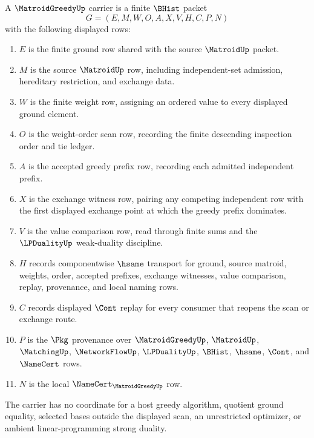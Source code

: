 \begin{definition}
\label{def:matroid-greedy-carrier}
A $\MatroidGreedyUp$ carrier is a finite $\BHist$ packet
$$
G=(E,M,W,O,A,X,V,H,C,P,N)
$$
with the following displayed rows:
\begin{enumerate}
\item $E$ is the finite ground row shared with the source $\MatroidUp$ packet.
\item $M$ is the source $\MatroidUp$ row, including independent-set admission, hereditary restriction, and exchange data.
\item $W$ is the finite weight row, assigning an ordered value to every displayed ground element.
\item $O$ is the weight-order scan row, recording the finite descending inspection order and tie ledger.
\item $A$ is the accepted greedy prefix row, recording each admitted independent prefix.
\item $X$ is the exchange witness row, pairing any competing independent row with the first displayed exchange point at which the greedy prefix dominates.
\item $V$ is the value comparison row, read through finite sums and the $\LPDualityUp$ weak-duality discipline.
\item $H$ records componentwise $\hsame$ transport for ground, source matroid, weights, order, accepted prefixes, exchange witnesses, value comparison, replay, provenance, and local naming rows.
\item $C$ records displayed $\Cont$ replay for every consumer that reopens the scan or exchange route.
\item $P$ is the $\Pkg$ provenance over $\MatroidGreedyUp$, $\MatroidUp$, $\MatchingUp$, $\NetworkFlowUp$, $\LPDualityUp$, $\BHist$, $\hsame$, $\Cont$, and $\NameCert$ rows.
\item $N$ is the local $\NameCert_{\MatroidGreedyUp}$ row.
\end{enumerate}
The carrier has no coordinate for a host greedy algorithm, quotient ground equality, selected bases outside the displayed scan, an unrestricted optimizer, or ambient linear-programming strong duality.
\end{definition}

